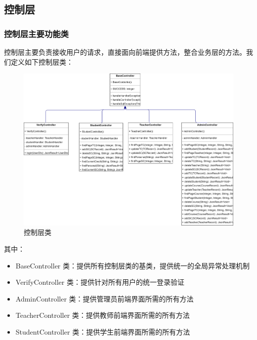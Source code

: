 \documentclass[12pt, a4paper]{article}
\begin{document}
\subsection{控制层}
\subsubsection{控制层主要功能类}
控制层主要负责接收用户的请求，直接面向前端提供方法，整合业务层的方法。我们定义如下控制层类：
\begin{figure}[H]
  \centering
  \includegraphics[width = 0.9 \textwidth]{Controller.png}
  \caption{控制层类}
\end{figure}

其中：
\begin{itemize}
  \item BaseController 类：提供所有控制层类的基类，提供统一的全局异常处理机制
  \item VerifyController 类：提供针对所有用户的统一登录验证
  \item AdminController 类：提供管理员前端界面所需的所有方法
  \item TeacherController 类：提供教师前端界面所需的所有方法
  \item StudentController 类：提供学生前端界面所需的所有方法
\end{itemize}
\end{document}
